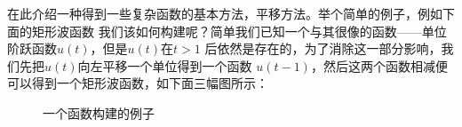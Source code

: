 \documentclass{ctexart}
\begin{document}
在此介绍一种得到一些复杂函数的基本方法，平移方法。举个简单的例子，例如下面的矩形波函数
我们该如何构建呢？简单我们已知一个与其很像的函数——单位阶跃函数$u(t)$，但是$u(t)$在$t>1$
后依然是存在的，为了消除这一部分影响，我们先把$u(t)$向左平移一个单位得到一个函数
$u(t - 1)$，然后这两个函数相减便可以得到一个矩形波函数，如下面三幅图所示：
\begin{figure}[H]
    \centering
    \begin{minipage}{\textwidth}
        \centering
        \centering
        \centering

    \end{minipage}
    \caption{一个函数构建的例子}
    \label{Fig:3}
\end{figure}
\end{document}
